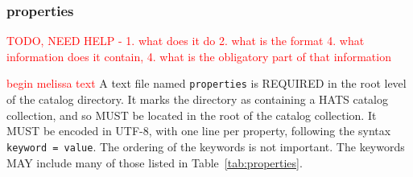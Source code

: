 \documentclass[11pt,a4paper]{ivoa}
\begin{document}
    \subsubsection{properties} 
    \textcolor{red}{TODO, NEED HELP - 1. what does it do 2. what is the format 4. what information does it contain, 4. what is the obligatory part of that information} 
    
    \textcolor{red}{begin melissa text}
A text file named \texttt{properties} is REQUIRED in the root level of the catalog directory.
It marks the directory as containing a HATS catalog collection, and so MUST be located in the 
root of the catalog collection.
It MUST be encoded in UTF-8, with one line per property, following the syntax \texttt{keyword = value}.
The ordering of the keywords is not important. The keywords MAY include many of those listed in Table~\ref{tab:properties}.
\end{document}
